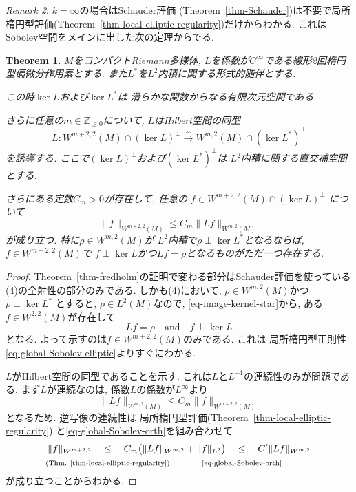 \documentclass[dvipdfmx,a4paper,11pt]{article} %
\newtheorem{thm}{Theorem}[section]
\theoremstyle{definition}
\theoremstyle{remark}
\newtheorem{rem}[thm]{Remark}
\numberwithin{equation}{section}
\newcommand{\underalign}[2]{%
  \quad
  \underset{\mathclap{\raisebox{-1.6ex}{\ensuremath{\scriptstyle #1}}}}{#2}
  \quad
}
\begin{document}
\begin{rem}
\label{rem-fredholm}
$k=\infty$の場合はSchauder評価 (Theorem~\ref{thm-Schauder})は不要で局所楕円型評価(Theorem~\ref{thm-local-elliptic-regularity})だけからわかる. これはSobolev空間をメインに出した次の定理からでる. 

\begin{thm}
\label{thm-fredholm-Sobolev}
$M$をコンパクトRiemann多様体,
 $L$を係数が$C^\infty$である線形2回楕円型偏微分作用素とする.
また$L^*$を$L^2$内積に関する形式的随伴とする.

この時$\ker L$および$\ker L^*$は
滑らかな関数からなる有限次元空間である.

さらに任意の$m\in\mathbb Z_{\geq 0}$について,
$L$はHilbert空間の同型
\[
L\colon
W^{m+2,2}(M)\cap(\ker L)^\perp
\overset{\sim}{\longrightarrow}
W^{m,2}(M)\cap(\ker L^*)^\perp
\]
を誘導する.
ここで$(\ker L)^\perp$および$(\ker L^*)^\perp$は
$L^2$内積に関する直交補空間とする.

さらにある定数$C_m>0$が存在して,
任意の
$f\in W^{m+2,2}(M)\cap(\ker L)^\perp$
について
\begin{equation}
\label{eq-global-Sobolev-orth-m}
\lVert f\rVert_{W^{m+2,2}(M)}
\leq
C_m\lVert Lf\rVert_{W^{m,2}(M)}
\end{equation}
が成り立つ.
特に$\rho\in W^{m,2}(M)$が
$L^2$内積で$\rho\perp\ker L^*$となるならば,
$f\in W^{m+2,2}(M)$で
$f\perp\ker L$かつ$Lf=\rho$となるものがただ一つ存在する.
\end{thm}
\begin{proof}
Theorem~\ref{thm-fredholm}の証明で変わる部分はSchauder評価を使っている(4)の全射性の部分のみである. しかも(4)において,  
$\rho\in W^{m,2}(M)$かつ
\(
\rho\perp\ker L^*
\)
とすると, $\rho\in L^2(M)$なので, 
\eqref{eq-image-kernel-star}から, ある$f\in W^{2,2}(M)$が存在して
\[
Lf=\rho \quad \text{and} \quad f\perp\ker L
\]
となる. よって示すのは$f \in W^{m+2,2}(M)$のみである. 
これは
局所楕円型正則性\eqref{eq-global-Sobolev-elliptic}よりすぐにわかる. 

$L$がHilbert空間の同型であることを示す. 
これは$L$と$L^{-1}$の連続性のみが問題である. まず$L$が連続なのは, 係数$L$の係数が$L^\infty$より
$$
\lVert Lf\rVert_{W^{m,2}(M)}
\leq
C_m
\lVert f\rVert_{W^{m+2,2}(M)}
$$
となるため. 逆写像の連続性は
局所楕円型評価(Theorem~\ref{thm-local-elliptic-regularity})
と\eqref{eq-global-Sobolev-orth}を組み合わせて
\[
\|f\|_{W^{m+2,2}}
\underalign{\text{(Thm. \ref{thm-local-elliptic-regularity})}}{\leq}
C_m\bigl(\|Lf\|_{W^{m,2}}+\|f\|_{L^2}\bigr)
\underalign{\text{\eqref{eq-global-Sobolev-orth}}}{\leq}
C'\|Lf\|_{W^{m,2}}
\]が成り立つことからわかる. 
\end{proof}


\end{rem}
\end{document}
